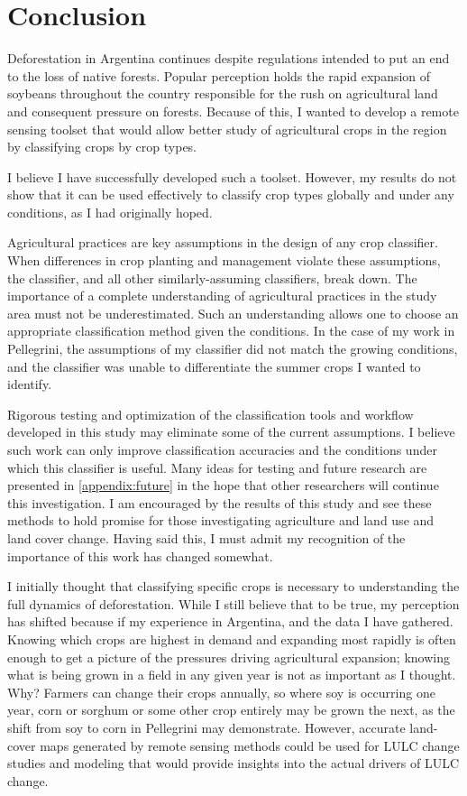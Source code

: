 \chapter{Conclusion}

Deforestation in Argentina continues despite regulations intended to put an end to the loss of native forests. Popular perception holds the rapid expansion of soybeans throughout the country responsible for the rush on agricultural land and consequent pressure on forests. Because of this, I wanted to develop a remote sensing toolset that would allow better study of agricultural crops in the region by classifying crops by crop types.

I believe I have successfully developed such a toolset. However, my results do not show that it can be used effectively to classify crop types globally and under any conditions, as I had originally hoped.

Agricultural practices are key assumptions in the design of any crop classifier. When differences in crop planting and management violate these assumptions, the classifier, and all other similarly-assuming classifiers, break down. The importance of a complete understanding of agricultural practices in the study area must not be underestimated. Such an understanding allows one to choose an appropriate classification method given the conditions. In the case of my work in Pellegrini, the assumptions of my classifier did not match the growing conditions, and the classifier was unable to differentiate the summer crops I wanted to identify.

Rigorous testing and optimization of the classification tools and workflow developed in this study may eliminate some of the current assumptions. I believe such work can only improve classification accuracies and the conditions under which this classifier is useful.  Many ideas for testing and future research are presented in \autoref{appendix:future} in the hope that other researchers will continue this investigation. I am encouraged by the results of this study and see these methods to hold promise for those investigating agriculture and land use and land cover change. Having said this, I must admit my recognition of the importance of this work has changed somewhat.

I initially thought that classifying specific crops is necessary to understanding the full dynamics of deforestation. While I still believe that to be true, my perception has shifted because if my experience in Argentina, and the data I have gathered. Knowing which crops are highest in demand and expanding most rapidly is often enough to get a picture of the pressures driving agricultural expansion; knowing what is being grown in a field in any given year is not as important as I thought. Why? Farmers can change their crops annually, so where soy is occurring one year, corn or sorghum or some other crop entirely may be grown the next, as the shift from soy to corn in Pellegrini may demonstrate. However, accurate land-cover maps generated by remote sensing methods could be used for LULC change studies and modeling that would provide insights into the actual drivers of LULC change.

